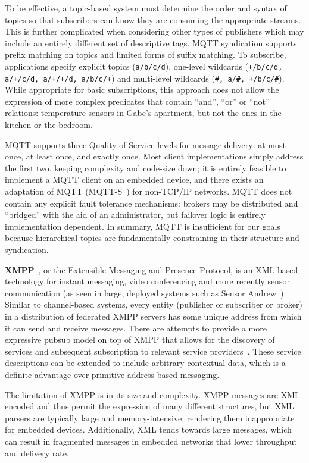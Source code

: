 To be effective, a topic-based system must determine the order and syntax of topics so that subscribers can know they are consuming the appropriate streams.
This is further complicated when considering other types of publishers which may include an entirely different set of descriptive tags.
MQTT syndication supports prefix matching on topics and limited forms of suffix matching.
To subscribe, applications specify explicit topics (\texttt{a/b/c/d}), one-level wildcards (\texttt{+/b/c/d, a/+/c/d, a/+/+/d, a/b/c/+}) and multi-level wildcards (\texttt{\#, a/\#, +/b/c/\#}).
While appropriate for basic subscriptions, this approach does not allow the expression of more complex predicates that contain ``and'', ``or'' or ``not'' relations: temperature sensors in Gabe's apartment, but not the ones in the kitchen or the bedroom.

MQTT supports three Quality-of-Service levels for message delivery: at most once, at least once, and exactly once.
Most client implementations simply address the first two, keeping complexity and code-size down; it is entirely feasible to implement a MQTT client on an embedded device, and there exists an adaptation of MQTT (MQTT-S~\cite{hunkeler2008mqtt}) for non-TCP/IP networks.
MQTT does not contain any explicit fault tolerance mechanisms: brokers may be distributed and ``bridged'' with the aid of an administrator, but failover logic is entirely implementation dependent.
In summary, MQTT is insufficient for our goals because hierarchical topics are fundamentally constraining in their structure and syndication.

\textbf{XMPP}~\cite{saint2011extensible}, or the Extensible Messaging and Presence Protocol, is an XML-based technology for instant messaging, video conferencing and more recently sensor communication (as seen in large, deployed systems such as Sensor Andrew~\cite{rowe2011sensor}).
Similar to channel-based systems, every entity (publisher or subscriber or broker) in a distribution of federated XMPP servers has some unique address from which it can send and receive messages.
There are attempts to provide a more expressive pubsub model on top of XMPP that allows for the discovery of services and subsequent subscription to relevant service providers~\cite{millard2010xep}.
These service descriptions can be extended to include arbitrary contextual data, which is a definite advantage over primitive address-based messaging.

The limitation of XMPP is in its size and complexity.
XMPP messages are XML-encoded and thus permit the expression of many different structures, but XML parsers are typically large and memory-intensive, rendering them inappropriate for embedded devices.
Additionally, XML tends towards large messages, which can result in fragmented messages in embedded networks that lower throughput and delivery rate.

